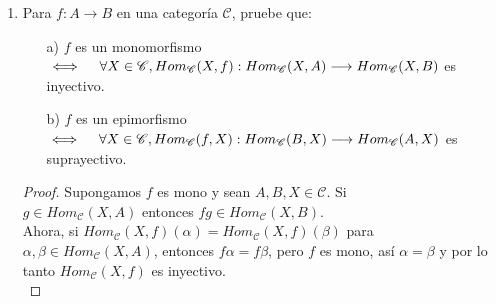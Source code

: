 \documentclass{article}
\begin{document}
\begin{enumerate}[label=\textbf{Ej \arabic*.}]
\begin{proof}
Supongamos $fg$ es mono con $f,g\in Mor(\mathscr{C})$, entonces para todo $k,h\in Mor(\mathscr{C})$, si $gk=gh$ se tiene que $fgk=fgh$ y como
$fg$ es mono entonces $k=h$ por lo tanto $g$ es mono.\\

Supongamos $fg$ es epi con $f,g\in Mor(\mathscr{C})$, entonces para todo \\ $k,h\in Mor(\mathscr{C})$, si $kf=hf$ se tiene que $kfg=hfg$ y como
$fg$ es epi entonces $k=h$ por lo tanto $f$ es epi.\\

Supongamos que $f\colon A\longrightarrow B$ es iso, entonces 
\begin{gather*}
\exists g\colon B\longrightarrow A\quad \text{tal que}\quad fg=1_B,\,\, gf=1_A,\\
\text{entonces}\quad
\exists g\colon B\longrightarrow A\quad \text{tal que}\quad fg=1_B\\
\quad\text{y}\quad\quad \exists g\colon B\longrightarrow A\quad \text{tal que}\quad gf=1_A
\end{gather*}
por lo que  $f$ es split-epi y $f$ es split-mono.\\

Ahora supongamos que $f\colon A\longrightarrow B$  es split-mono y split-epi. Entonces existen $g_1\colon B\longrightarrow A$ y 
$g_2\colon B\longrightarrow A$ tales que $fg_1=1_B$ y $g_2f=1_A$.\\
Como $fg_1=1_B$ entonces aplicando $g_2$ por la izquierda se tiene que $g_2fg_1=g_21_B$, así $1_Ag_1=g_21_B$.
Por lo tanto $g_1=g_2$ y así $f$ es iso.\\

 Este inciso es consecuencia de f) y b).
\end{proof}
		\item Para $f\colon A\longrightarrow B$ en una categoría $\mathscr{C}$, pruebe que:
\begin{itemize}
\item[a)] $f$ es un monomorfismo $\iff\quad \forall X\in \mathscr{C},\\ Hom_{\mathscr{C}}(X,f):Hom_{\mathscr{C}}(X,A)\longrightarrow
Hom_{\mathscr{C}}(X,B)$ es inyectivo.\\
\item[b)] $f$ es un epimorfismo $\iff\quad \forall X\in \mathscr{C}, \\Hom_{\mathscr{C}}(f,X):Hom_{\mathscr{C}}(B,X)\longrightarrow
Hom_{\mathscr{C}}(A,X)$ es suprayectivo.
\end{itemize}
\begin{proof}
 Supongamos $f$ es mono y sean $A,B,X\in \mathscr{C}$. Si \\ $g\in Hom_{\mathscr{C}}(X,A)$ entonces $fg\in Hom_{\mathscr{C}}(X,B)$.\\
Ahora, si $ Hom_{\mathscr{C}}(X,f)(\alpha)=Hom_{\mathscr{C}}(X,f)(\beta)$ para  $\alpha,\beta\in Hom_{\mathscr{C}}(X,A)$, entonces
$f\alpha=f\beta$, pero $f$ es mono, así $\alpha=\beta$ y por lo tanto $Hom_{\mathscr{C}}(X,f)$ es inyectivo.\\


\end{proof}
\end{enumerate}
\end{document}
